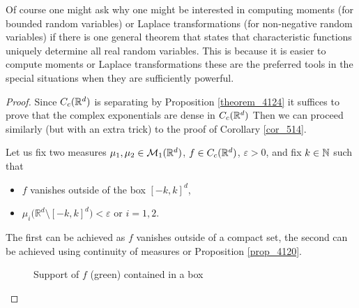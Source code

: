 Of course one might ask why one might be interested in computing moments (for bounded random variables) or Laplace transformations (for non-negative random variables) if there is one general theorem that states that characteristic functions uniquely determine all real random variables. This is because it is easier to compute moments or Laplace transformations these are the preferred tools in the special situations when they are sufficiently powerful.
\begin{proof}[Proof]
	Since $C_c(\mathbb{R}^d)$ is separating by Proposition \ref{theorem_4124} it suffices to prove that the complex exponentials are dense in $C_c(\mathbb{R}^d)$ Then we can proceed similarly (but with an extra trick) to the proof of Corollary \ref{cor_514}.\smallskip
	
	Let us fix two measures $\mu_1, \mu_2\in \mathcal{M}_1(\mathbb{R}^d)$, $f\in C_c(\mathbb{R}^d)$, $\varepsilon>0$, and fix $k\in \mathbb{N}$ such that
	\begin{itemize}
		\item $f$ vanishes outside of the box $[-k,k]^d$,
		\item $\mu_i \big( \mathbb{R}^d  \setminus [-k,k]^d \big) < \varepsilon$ or $i=1,2$.
	\end{itemize}
	The first can be achieved as $f$ vanishes outside of a compact set, the second can be achieved using continuity of measures or Proposition \ref{prop_4120}.
	\begin{figure}[h]
		\begin{center}
			\caption*{Support of $f$ (green) contained in a box}
	\end{center}
	\end{figure}


\end{proof}

